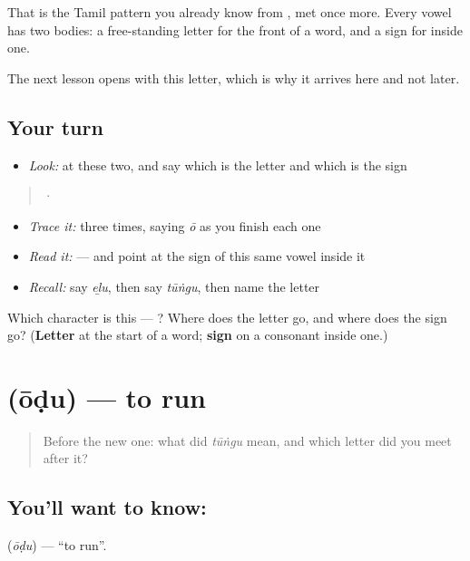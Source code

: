 That is the Tamil pattern you already know from , met once more. Every vowel has two bodies: a free-standing letter for the front of a word, and a sign for inside one.

The next lesson opens with this letter, which is why it arrives here and not later.

\subsection*{Your turn}
\begin{itemize}
\raggedright
  \item \emph{Look:} at these two, and say which is the letter and which is the sign
\end{itemize}

\begin{quote}
  ·  
\end{quote}

\begin{itemize}
\raggedright
  \item \emph{Trace it:}  three times, saying \emph{ō} as you finish each one
  \item \emph{Read it:} \textbf{} — and point at the sign of this same vowel inside it
  \item \emph{Recall:} say \emph{eḻu}, then say \emph{tūṅgu}, then name the letter \textbf{}
\end{itemize}

\begin{tcolorbox}[breakable,colback=teal!4,colframe=teal!35!black,title={Before you move on}]
Which character is this — ? Where does the letter go, and where does the sign  go? (\textbf{Letter} at the start of a word; \textbf{sign} on a consonant inside one.)
\end{tcolorbox}
\section[\texorpdfstring{\ta{ஓடு} (ōḍu)}{ஓடு (ōḍu)}]{ (ōḍu) — to run}

\label{lesson:TA-C71-run}



\begin{quote}
Before the new one: what did \emph{tūṅgu} mean, and which letter did you meet after it?
\end{quote}

\subsection*{You'll want to know: }
\textbf{} (\emph{ōḍu}) — \textquotedblleft{}to run\textquotedblright{}.

